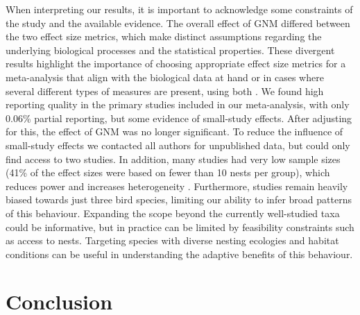 \documentclass[
  number,
  review,
  onecolumn]{elsarticle}
\begin{document}
When interpreting our results, it is important to acknowledge some
constraints of the study and the available evidence. The overall effect
of GNM differed between the two effect size metrics, which make distinct
assumptions regarding the underlying biological processes and the
statistical properties. These divergent results highlight the importance
of choosing appropriate effect size metrics for a meta-analysis that
align with the biological data at hand or in cases where several
different types of measures are present, using both \citep{yang2024}. We
found high reporting quality in the primary studies included in our
meta-analysis, with only 0.06\% partial reporting, but some evidence of
small-study effects. After adjusting for this, the effect of GNM was no
longer significant. To reduce the influence of small-study effects we
contacted all authors for unpublished data, but could only find access
to two studies. In addition, many studies had very low sample sizes
(41\% of the effect sizes were based on fewer than 10 nests per group),
which reduces power and increases heterogeneity \citep{inthout2015}.
Furthermore, studies remain heavily biased towards just three bird
species, limiting our ability to infer broad patterns of this behaviour.
Expanding the scope beyond the currently well-studied taxa could be
informative, but in practice can be limited by feasibility constraints
such as access to nests. Targeting species with diverse nesting
ecologies and habitat conditions can be useful in understanding the
adaptive benefits of this behaviour.

\section{Conclusion}\label{conclusion}
\end{document}
